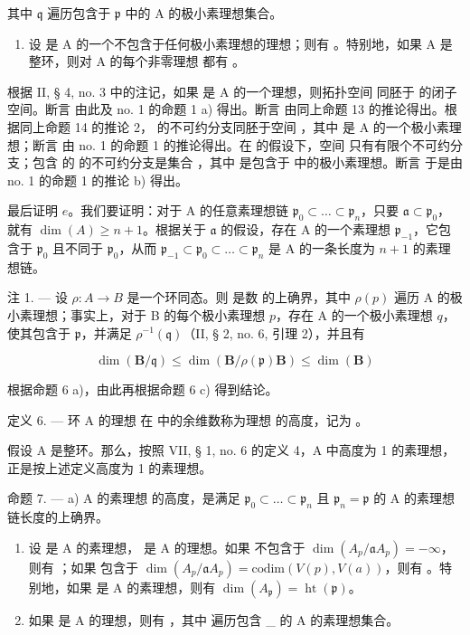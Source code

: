 其中 \(\mathfrak{q}\) 遍历包含于 \(\mathfrak{p}\) 中的 A 的极小素理想集合。

\begin{enumerate}
\def\labelenumi{\alph{enumi})}
\setcounter{enumi}{4}
\tightlist
\item
设  是 A 的一个不包含于任何极小素理想的理想；则有 。特别地，如果 A 是整环，则对 A 的每个非零理想  都有 。
\end{enumerate}

根据 II, § 4, no. 3 中的注记，如果  是 A 的一个理想，则拓扑空间  同胚于  的闭子空间。断言  由此及 no. 1 的命题 1 a) 得出。断言  由同上命题 13 的推论得出。根据同上命题 14 的推论 2， 的不可约分支同胚于空间 ，其中  是 A 的一个极小素理想；断言  由 no. 1 的命题 1 的推论得出。在  的假设下，空间  只有有限个不可约分支；包含  的  的不可约分支是集合 ，其中  是包含于  中的极小素理想。断言  于是由 no. 1 的命题 1 的推论 b) 得出。

最后证明 \(e\)。我们要证明：对于 A 的任意素理想链 \(\mathfrak{p}_{0} \subset \ldots \subset \mathfrak{p}_{n}\)，只要 \(\mathfrak{a} \subset \mathfrak{p}_{0}\)，就有 \(\dim(A) \geqslant n + 1\)。根据关于 \(\mathfrak{a}\) 的假设，存在 A 的一个素理想 \(\mathfrak{p}_{-1}\)，它包含于 \(\mathfrak{p}_{0}\) 且不同于 \(\mathfrak{p}_{0}\)，从而 \(\mathfrak{p}_{-1} \subset \mathfrak{p}_{0} \subset \ldots \subset \mathfrak{p}_{n}\) 是 A 的一条长度为 \(n + 1\) 的素理想链。

注 1. --- 设 \(\rho: A \to B\) 是一个环同态。则  是数  的上确界，其中 \(\rho(p)\) 遍历 A 的极小素理想；事实上，对于 B 的每个极小素理想 \(p\)，存在 A 的一个极小素理想 \(q\)，使其包含于 \(\mathfrak{p}\)，并满足 \(\rho^{-1}(\mathfrak{q})\)（II, § 2, no. 6, 引理 2），并且有

\[
\dim (\mathbf {B} / \mathfrak {q}) \leqslant \dim (\mathbf {B} / \rho (\mathfrak {p})\mathbf {B}) \leqslant \dim (\mathbf {B})
\]

根据命题 6 a)，由此再根据命题 6 c) 得到结论。

定义 6. --- 环 A 的理想  在  中的余维数称为理想  的高度，记为 。

假设 A 是整环。那么，按照 VII, § 1, no. 6 的定义 4，A 中高度为 1 的素理想，正是按上述定义高度为 1 的素理想。

命题 7. --- a) A 的素理想  的高度，是满足 \(\mathfrak{p}_{0} \subset \ldots \subset \mathfrak{p}_{n}\) 且 \(\mathfrak{p}_{n} = \mathfrak{p}\) 的 A 的素理想链长度的上确界。

\begin{enumerate}
\def\labelenumi{\alph{enumi})}
\setcounter{enumi}{1}
\item
设  是 A 的素理想， 是 A 的理想。如果  不包含于 \(\dim(A_{p}/\mathfrak{a}A_{p}) = -\infty\)，则有 ；如果  包含于 \(\dim(A_{p}/\mathfrak{a}A_{p}) = \text{codim}(V(p), V(a))\)，则有 。特别地，如果  是 A 的素理想，则有 \(\dim(A_{\mathfrak{p}}) = \operatorname{ht}(\mathfrak{p})\)。
\item
如果  是 A 的理想，则有 ，其中  遍历包含 \_ 的 A 的素理想集合。
\end{enumerate}

